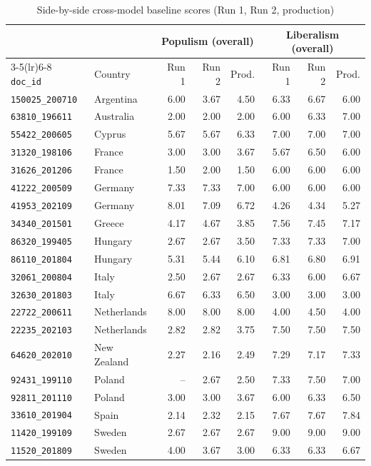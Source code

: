 \begin{table}[ht]
\centering
\caption{Side-by-side cross-model baseline scores (Run 1, Run 2, production)}
\label{tab:verify_sidebyside}
\footnotesize
\begin{tabular}{llrrrrrr}
\toprule
 & & \multicolumn{3}{c}{Populism (overall)} & \multicolumn{3}{c}{Liberalism (overall)} \\
\cmidrule(lr){3-5}\cmidrule(lr){6-8}
\texttt{doc\_id} & Country & Run 1 & Run 2 & Prod. & Run 1 & Run 2 & Prod. \\
\midrule
\texttt{150025\_200710} & Argentina & 6.00 & 3.67 & 4.50 & 6.33 & 6.67 & 6.00 \\
\texttt{63810\_196611} & Australia & 2.00 & 2.00 & 2.00 & 6.00 & 6.33 & 7.00 \\
\texttt{55422\_200605} & Cyprus & 5.67 & 5.67 & 6.33 & 7.00 & 7.00 & 7.00 \\
\texttt{31320\_198106} & France & 3.00 & 3.00 & 3.67 & 5.67 & 6.50 & 6.00 \\
\texttt{31626\_201206} & France & 1.50 & 2.00 & 1.50 & 6.00 & 6.00 & 6.00 \\
\texttt{41222\_200509} & Germany & 7.33 & 7.33 & 7.00 & 6.00 & 6.00 & 6.00 \\
\texttt{41953\_202109} & Germany & 8.01 & 7.09 & 6.72 & 4.26 & 4.34 & 5.27 \\
\texttt{34340\_201501} & Greece & 4.17 & 4.67 & 3.85 & 7.56 & 7.45 & 7.17 \\
\texttt{86320\_199405} & Hungary & 2.67 & 2.67 & 3.50 & 7.33 & 7.33 & 7.00 \\
\texttt{86110\_201804} & Hungary & 5.31 & 5.44 & 6.10 & 6.81 & 6.80 & 6.91 \\
\texttt{32061\_200804} & Italy & 2.50 & 2.67 & 2.67 & 6.33 & 6.00 & 6.67 \\
\texttt{32630\_201803} & Italy & 6.67 & 6.33 & 6.50 & 3.00 & 3.00 & 3.00 \\
\texttt{22722\_200611} & Netherlands & 8.00 & 8.00 & 8.00 & 4.00 & 4.50 & 4.00 \\
\texttt{22235\_202103} & Netherlands & 2.82 & 2.82 & 3.75 & 7.50 & 7.50 & 7.50 \\
\texttt{64620\_202010} & New Zealand & 2.27 & 2.16 & 2.49 & 7.29 & 7.17 & 7.33 \\
\texttt{92431\_199110} & Poland & -- & 2.67 & 2.50 & 7.33 & 7.50 & 7.00 \\
\texttt{92811\_201110} & Poland & 3.00 & 3.00 & 3.67 & 6.00 & 6.33 & 6.50 \\
\texttt{33610\_201904} & Spain & 2.14 & 2.32 & 2.15 & 7.67 & 7.67 & 7.84 \\
\texttt{11420\_199109} & Sweden & 2.67 & 2.67 & 2.67 & 9.00 & 9.00 & 9.00 \\
\texttt{11520\_201809} & Sweden & 4.00 & 3.67 & 3.00 & 6.33 & 6.33 & 6.67 \\
\bottomrule
\end{tabular}
\end{table}
